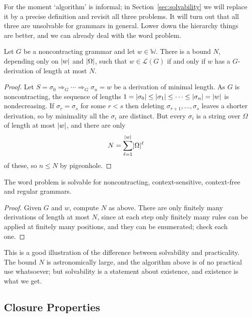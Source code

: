 \documentclass[a4paper]{scrartcl}
\newcommand{\WW}{\mathbb{W}}
\newcommand{\lang}{\mathcal{L}}
\begin{document}
For the moment `algorithm' is informal; in Section~\ref{sec:solvability} we will replace it by a precise definition and revisit all three problems. It will turn out that all three are unsolvable for grammars in general. Lower down the hierarchy things are better, and we can already deal with the word problem.

\begin{lemma}\label{lem:wordproblembound}
	Let $G$ be a noncontracting grammar and let $w \in \WW$. There is a bound $N$, depending only on $\lvert w\rvert$ and $\lvert\Omega\rvert$, such that $w \in \lang(G)$ if and only if $w$ has a $G$-derivation of length at most $N$.
\end{lemma}

\begin{proof}
	Let $S = \sigma_0 \Rightarrow_G \cdots \Rightarrow_G \sigma_n = w$ be a derivation of minimal length. As $G$ is noncontracting, the sequence of lengths $1 = \lvert\sigma_0\rvert \leq \lvert\sigma_1\rvert \leq \cdots \leq \lvert\sigma_n\rvert = \lvert w\rvert$ is nondecreasing. If $\sigma_r = \sigma_s$ for some $r < s$ then deleting $\sigma_{r+1}, \dots, \sigma_s$ leaves a shorter derivation, so by minimality all the $\sigma_i$ are distinct. But every $\sigma_i$ is a string over $\Omega$ of length at most $\lvert w\rvert$, and there are only
	$$N = \sum_{\ell = 1}^{\lvert w\rvert} \lvert\Omega\rvert^\ell$$
	of these, so $n \leq N$ by pigeonhole.
\end{proof}

\begin{corollary}\label{cor:wordproblemsolvable}
	The word problem is solvable for noncontracting, context-sensitive, context-free and regular grammars.
\end{corollary}

\begin{proof}
	Given $G$ and $w$, compute $N$ as above. There are only finitely many derivations of length at most $N$, since at each step only finitely many rules can be applied at finitely many positions, and they can be enumerated; check each one.
\end{proof}

This is a good illustration of the difference between solvability and practicality. The bound $N$ is astronomically large, and the algorithm above is of no practical use whatsoever; but solvability is a statement about existence, and existence is what we get.

\subsection{Closure Properties}
\end{document}
